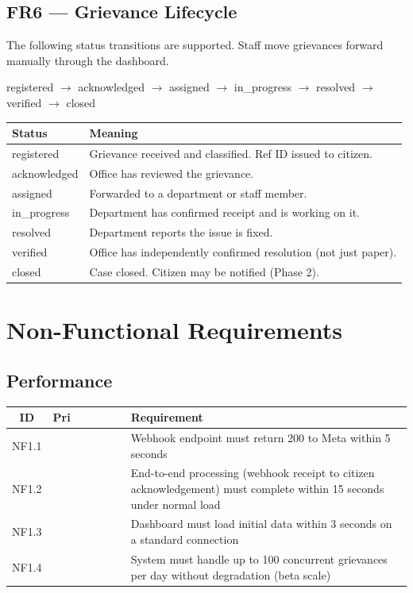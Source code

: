 \documentclass[11pt, a4paper]{article}
\newcommand{\must}{\textcolor{white}{\colorbox{mustcol}{\textbf{\ MUST\ }}}}
\newcommand{\should}{\textcolor{white}{\colorbox{shouldcol}{\textbf{\ SHOULD\ }}}}
\newcommand{\could}{\textcolor{white}{\colorbox{couldcol}{\textbf{\ COULD\ }}}}
\begin{document}
\subsection{FR6 --- Grievance Lifecycle}

The following status transitions are supported. Staff move grievances forward manually through the dashboard.

\begin{center}
\begin{tcolorbox}[colback=lightgray, colframe=pollityblue, sharp corners]
\small\ttfamily
registered $\to$ acknowledged $\to$ assigned $\to$ in\_progress $\to$ resolved $\to$ verified $\to$ closed
\end{tcolorbox}
\end{center}

\begin{tabularx}{\linewidth}{lX}
\toprule
\textbf{Status} & \textbf{Meaning} \\
\midrule
registered   & Grievance received and classified. Ref ID issued to citizen. \\
acknowledged & Office has reviewed the grievance. \\
assigned     & Forwarded to a department or staff member. \\
in\_progress & Department has confirmed receipt and is working on it. \\
resolved     & Department reports the issue is fixed. \\
verified     & Office has independently confirmed resolution (not just paper). \\
closed       & Case closed. Citizen may be notified (Phase 2). \\
\bottomrule
\end{tabularx}

\newpage

\section{Non-Functional Requirements}

\subsection{Performance}

\begin{tabularx}{\linewidth}{clX}
\toprule
\textbf{ID} & \textbf{Pri} & \textbf{Requirement} \\
\midrule
NF1.1 & \must   & Webhook endpoint must return 200 to Meta within 5 seconds \\
NF1.2 & \must   & End-to-end processing (webhook receipt to citizen acknowledgement) must complete within 15 seconds under normal load \\
NF1.3 & \should & Dashboard must load initial data within 3 seconds on a standard connection \\
NF1.4 & \could  & System must handle up to 100 concurrent grievances per day without degradation (beta scale) \\
\bottomrule
\end{tabularx}
\end{document}
